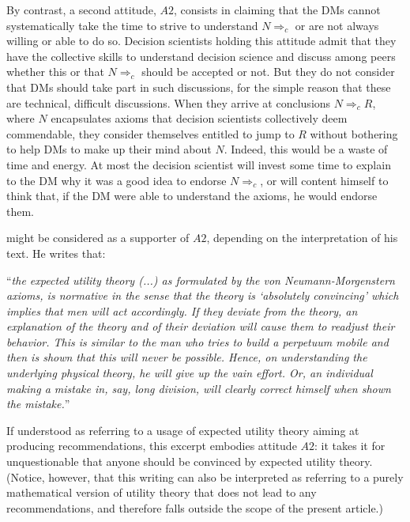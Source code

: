 \documentclass[preprint, french, english, 11pt, authoryear]{elsarticle}%
\begin{document}
By contrast, a second attitude, $A2$, consists in claiming that the \acp{DM} cannot systematically take the time to strive to understand $N⇒_c$ or are not always willing or able to do so. Decision scientists holding this attitude admit that they have the collective skills to understand decision science and discuss among peers whether this or that $N⇒_c$ should be accepted or not. But they do not consider that \acp{DM} should take part in such discussions, for the simple reason that these are technical, difficult discussions. When they arrive at conclusions $N ⇒_c R$, where $N$ encapsulates axioms that decision scientists collectively deem commendable, they consider themselves entitled to jump to $R$ without bothering to help \acp{DM} to make up their mind about $N$. Indeed, this would be a waste of time and energy. At most the decision scientist will invest some time to explain to the \ac{DM} why it was a good idea to endorse $N⇒_c$, or will content himself to think that, if the \ac{DM} were able to understand the axioms, he would endorse them.

\citet[p. 180]{morgenstern_reflections_1979} might be considered as a supporter of $A2$, depending on the interpretation of his text. He writes that: 

\begin{addmargin}[3em]{3em}
“\emph{the expected utility theory (...) as formulated by the von Neumann-Morgenstern axioms, is normative in the sense that the theory is ‘absolutely convincing’ which implies that men will act accordingly. If they deviate from the theory, an explanation of the theory and of their deviation will cause them to readjust their behavior. This is similar to the man who tries to build a perpetuum mobile and then is shown that this will never be possible. Hence, on understanding the underlying physical theory, he will give up the vain effort. Or, an individual making a mistake in, say, long division, will clearly correct himself when shown the mistake.}” 
\end{addmargin}
If understood as referring to a usage of expected utility theory aiming at producing recommendations, this excerpt embodies attitude $A2$: it takes it for unquestionable that anyone should be convinced by expected utility theory. (Notice, however, that this writing can also be interpreted as referring to a purely mathematical version of utility theory that does not lead to any recommendations, and therefore falls outside the scope of the present article.)
\end{document}
